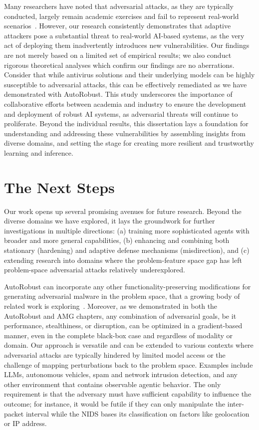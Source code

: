 Many researchers have noted that adversarial attacks, as they are typically conducted, largely remain academic exercises and fail to represent real-world scenarios~\cite{apruzzese2023real}.
However, our research consistently demonstrates that adaptive attackers pose a substantial threat to real-world AI-based systems, as the very act of deploying them inadvertently introduces new vulnerabilities.
Our findings are not merely based on a limited set of empirical results; we also conduct rigorous theoretical analyses which confirm our findings are no aberrations.
Consider that while antivirus solutions and their underlying models can be highly susceptible to adversarial attacks, this can be effectively remediated as we have demonstrated with AutoRobust.
This study underscores the importance of collaborative efforts between academia and industry to ensure the development and deployment of robust \gls{AI} systems, as adversarial threats will continue to proliferate.
Beyond the individual results, this dissertation lays a foundation for understanding and addressing these vulnerabilities by assembling insights from diverse domains, and setting the stage for creating more resilient and trustworthy learning and inference.

\section{The Next Steps}

Our work opens up several promising avenues for future research.
Beyond the diverse domains we have explored, it lays the groundwork for further investigations in multiple directions: (a) training more sophisticated agents with broader and more general capabilities, (b) enhancing and combining both stationary (hardening) and adaptive defense mechanisms (misdirection), and (c) extending research into domains where the problem-feature space gap has left problem-space adversarial attacks relatively underexplored.

AutoRobust can incorporate any other functionality-preserving modifications for generating adversarial malware in the problem space, that a growing body of related work is exploring~\cite{demetrio2021functionality, demetrio2021adversarial, labaca2021realizable, labaca2021aimed}.
Moreover, as we demonstrated in both the AutoRobust and AMG chapters, any combination of adversarial goals, be it performance, stealthiness, or disruption, can be optimized in a gradient-based manner, even in the complete black-box case and regardless of modality or domain.
Our approach is versatile and can be extended to various contexts where adversarial attacks are typically hindered by limited model access or the challenge of mapping perturbations back to the problem space.
Examples include \gls{LLM}s, autonomous vehicles, spam and network intrusion detection, and any other environment that contains observable agentic behavior.
The only requirement is that the adversary must have sufficient capability to influence the outcome; for instance, it would be futile if they can only manipulate the inter-packet interval while the \gls{NIDS} bases its classification on factors like geolocation or IP address.

